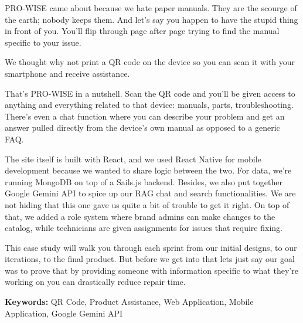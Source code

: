 \documentclass[12pt,a4paper]{report}
\begin{document}
PRO-WISE came about because we hate paper manuals. They are the scourge of the earth; nobody keeps them. And let's say you happen to have the stupid thing in front of you. You'll flip through page after page trying to find the manual specific to your issue.

\vspace{0.5cm}

We thought why not print a QR code on the device so you can scan it with your smartphone and receive assistance.

\vspace{0.5cm}

That's PRO-WISE in a nutshell. Scan the QR code and you'll be given access to anything and everything related to that device: manuals, parts, troubleshooting. There's even a chat function where you can describe your problem and get an answer pulled directly from the device's own manual as opposed to a generic FAQ.

\vspace{0.5cm}

The site itself is built with React, and we used React Native for mobile development because we wanted to share logic between the two. For data, we're running MongoDB on top of a Sails.js backend. Besides, we also put together Google Gemini API to spice up our RAG chat and search functionalities. We are not hiding that this one gave us quite a bit of trouble to get it right. On top of that, we added a role system where brand admins can make changes to the catalog, while technicians are given assignments for issues that require fixing.

\vspace{0.5cm}

This case study will walk you through each sprint from our initial designs, to our iterations, to the final product. But before we get into that lets just say our goal was to prove that by providing someone with information specific to what they're working on you can drastically reduce repair time.

\vspace{0.8cm}

\textbf{Keywords:} QR Code, Product Assistance, Web Application, Mobile Application, Google Gemini API

\vfill


\clearpage
{}

\tableofcontents
\thispagestyle{plain}
\end{document}
